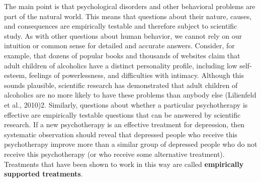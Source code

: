 
The main point is that psychological disorders and other behavioral problems are part of the natural world. This means that questions about their nature, causes, and consequences are empirically testable and therefore subject to scientific study. As with other questions about human behavior, we cannot rely on our intuition or common sense for detailed and accurate answers. Consider, for example, that dozens of popular books and thousands of websites claim that adult children of alcoholics have a distinct personality profile, including low self-esteem, feelings of powerlessness, and difficulties with intimacy. Although this sounds plausible, scientific research has demonstrated that adult children of alcoholics are no more likely to have these problems than anybody else (Lilienfeld et al., 2010)2. Similarly, questions about whether a particular psychotherapy is effective are empirically testable questions that can be answered by scientific research. If a new psychotherapy is an effective treatment for depression, then systematic observation should reveal that depressed people who receive this psychotherapy improve more than a similar group of depressed people who do not receive this psychotherapy (or who receive some alternative treatment). Treatments that have been shown to work in this way are called \textbf{empirically supported treatments}.

